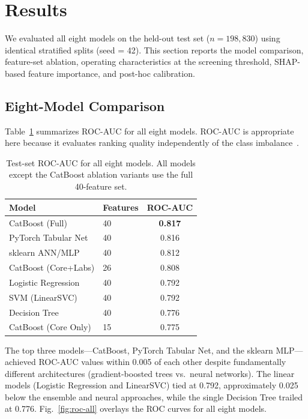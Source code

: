 \section{Results}
\label{sec:results}

We evaluated all eight models on the held-out test set ($n = 198{,}830$) using identical stratified splits (seed = 42). This section reports the model comparison, feature-set ablation, operating characteristics at the screening threshold, SHAP-based feature importance, and post-hoc calibration.

\subsection{Eight-Model Comparison}
\label{sec:results-comparison}

Table~\ref{tab:model-comparison} summarizes ROC-AUC for all eight models. ROC-AUC is appropriate here because it evaluates ranking quality independently of the class imbalance~\cite{Richardson2024roc}.

\begin{table}[ht]
\centering
\caption{Test-set ROC-AUC for all eight models. All models except the CatBoost ablation variants use the full 40-feature set.}
\label{tab:model-comparison}
\begin{tabular}{llc}
\hline
\textbf{Model} & \textbf{Features} & \textbf{ROC-AUC} \\
\hline
CatBoost (Full)          & 40 & \textbf{0.817} \\
PyTorch Tabular Net      & 40 & 0.816 \\
sklearn ANN/MLP          & 40 & 0.812 \\
CatBoost (Core+Labs)     & 26 & 0.808 \\
Logistic Regression      & 40 & 0.792 \\
SVM (LinearSVC)          & 40 & 0.792 \\
Decision Tree            & 40 & 0.776 \\
CatBoost (Core Only)     & 15 & 0.775 \\
\hline
\end{tabular}
\end{table}

The top three models---CatBoost, PyTorch Tabular Net, and the sklearn MLP---achieved ROC-AUC values within 0.005 of each other despite fundamentally different architectures (gradient-boosted trees vs.\ neural networks). The linear models (Logistic Regression and LinearSVC) tied at 0.792, approximately 0.025 below the ensemble and neural approaches, while the single Decision Tree trailed at 0.776. Fig.~\ref{fig:roc-all} overlays the ROC curves for all eight models.

